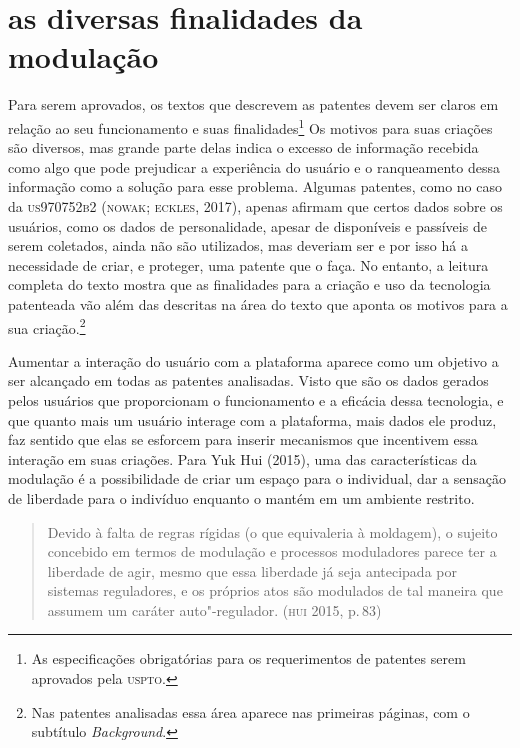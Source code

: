 \section{as diversas finalidades da modulação}

Para serem aprovados, os textos que descrevem as patentes devem ser
claros em relação ao seu funcionamento e suas finalidades\footnote{As
  especificações obrigatórias para os requerimentos de patentes serem
  aprovados pela \textsc{uspto}.} Os motivos para suas criações são diversos, mas grande
parte delas indica o excesso de informação recebida como algo que pode
prejudicar a experiência do usuário e o ranqueamento dessa informação
como a solução para esse problema. Algumas patentes, como no caso da
\textsc{us970752b2} (\textsc{nowak}; \textsc{eckles}, 2017), apenas afirmam que certos dados sobre
os usuários, como os dados de personalidade, apesar de disponíveis e
passíveis de serem coletados, ainda não são utilizados, mas deveriam ser
e por isso há a necessidade de criar, e proteger, uma patente que o
faça. No entanto, a leitura completa do texto mostra que as finalidades
para a criação e uso da tecnologia patenteada vão além das descritas na
área do texto que aponta os motivos para a sua criação.\footnote{Nas
  patentes analisadas essa área aparece nas primeiras páginas, com o
  subtítulo \textit{Background}.}

Aumentar a interação do usuário com a plataforma aparece como um
objetivo a ser alcançado em todas as patentes analisadas. Visto que são
os dados gerados pelos usuários que proporcionam o funcionamento e a
eficácia dessa tecnologia, e que quanto mais um usuário interage com a
plataforma, mais dados ele produz, faz sentido que elas se esforcem para
inserir mecanismos que incentivem essa interação em suas criações. Para
Yuk Hui (2015), uma das características da modulação é a possibilidade
de criar um espaço para o individual, dar a sensação de liberdade para o
indivíduo enquanto o mantém em um ambiente restrito.

\begin{quote}
Devido à falta de regras rígidas (o que equivaleria à moldagem), o
sujeito concebido em termos de modulação e processos moduladores parece
ter a liberdade de agir, mesmo que essa liberdade já seja antecipada por
sistemas reguladores, e os próprios atos são modulados de tal maneira
que assumem um caráter auto"-regulador. (\textsc{hui}
2015, p.\,83)
\end{quote}



